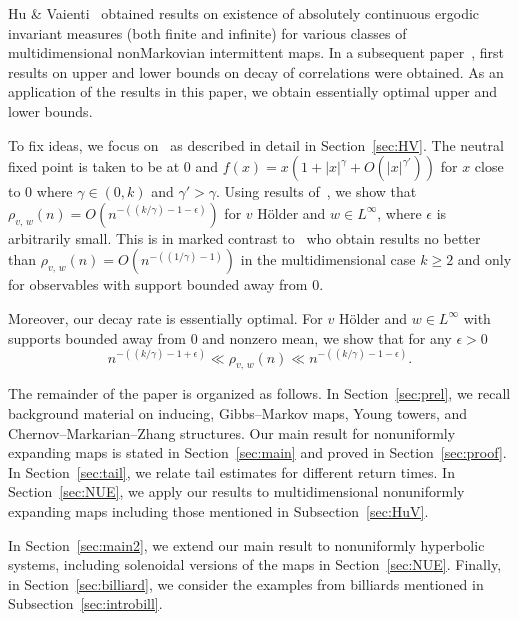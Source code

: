 \documentclass[10pt]{amsart}
\theoremstyle{definition}\newtheorem{defi}[theo]{Definition}\newtheorem{rema}[theo]{Remark}\newtheorem{exam}[theo]{Example}\newtheorem{exem}[theo]{Example}\newtheorem{nota}[theo]{Notation}
\newcommand{\eps}{\epsilon}
\begin{document}
Hu \& Vaienti~\cite{HuVaienti09} obtained results on existence of absolutely continuous ergodic invariant measures (both finite and infinite) for various classes of multidimensional nonMarkovian intermittent maps. In a subsequent paper~\cite{HuVaientiapp}, first results on upper and lower bounds on decay of correlations were obtained. As an application of the results in this paper, we obtain essentially optimal upper and lower bounds.

To fix ideas, we focus on~\cite[Example~5.1]{HuVaientiapp} as described in detail in Section~\ref{sec:HV}. The neutral fixed point is taken to be at $0$ and $f(x)=x(1+|x|^\gamma+O(|x|^{\gamma'}))$ for $x$ close to $0$ where $\gamma\in(0,k)$ and $\gamma'>\gamma$. Using results of~\cite{AFLV11,HuVaienti09}, we show that $\rho_{v,\,w}(n)=O(n^{-((k/\gamma)-1-\eps)})$ for $v$ H\"older and $w\in L^\infty$, where $\eps$ is arbitrarily small. This is in marked contrast to~\cite{HuVaientiapp} who obtain results no better than $\rho_{v,\,w}(n)=O(n^{-((1/\gamma)-1)})$ in the multidimensional case $k\ge2$ and only for observables with support bounded away from $0$.

Moreover, our decay rate is essentially optimal. For $v$ H\"older and $w\in L^\infty$ with supports bounded away from $0$ and nonzero mean, we show that for any $\eps>0$
\begin{equation}\label{eq:HV}
n^{-((k/\gamma)-1+\eps)}\ll \rho_{v,\,w}(n)\ll n^{-((k/\gamma)-1-\eps)}.
\end{equation}



The remainder of the paper is organized as follows. In Section~\ref{sec:prel}, we recall background material on inducing, Gibbs--Markov maps, Young towers, and Chernov--Markarian--Zhang structures. Our main result for nonuniformly expanding maps is stated in Section~\ref{sec:main} and proved in Section~\ref{sec:proof}. In Section~\ref{sec:tail}, we relate tail estimates for different return times. In Section~\ref{sec:NUE}, we apply our results to multidimensional nonuniformly expanding maps including those mentioned in Subsection~\ref{sec:HuV}.

In Section~\ref{sec:main2}, we extend our main result to nonuniformly hyperbolic systems, including solenoidal versions of the maps in Section~\ref{sec:NUE}. Finally, in Section~\ref{sec:billiard}, we consider the examples from billiards mentioned in Subsection~\ref{sec:introbill}.
\end{document}
